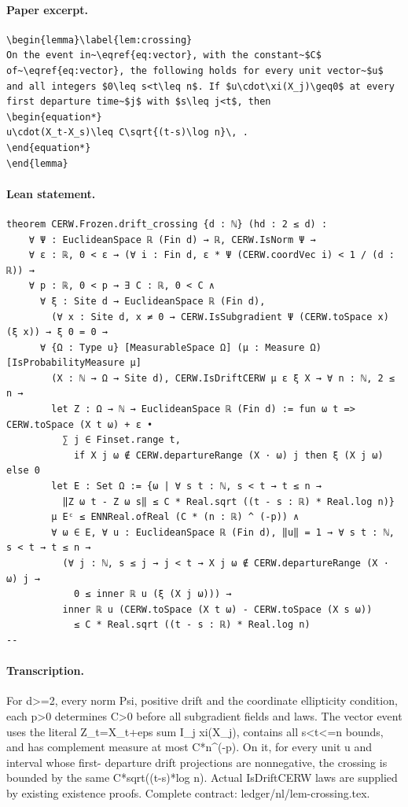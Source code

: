 \paragraph{Paper excerpt.}
\begin{verbatim}
\begin{lemma}\label{lem:crossing}
On the event in~\eqref{eq:vector}, with the constant~$C$ of~\eqref{eq:vector}, the following holds for every unit vector~$u$ and all integers $0\leq s<t\leq n$. If $u\cdot\xi(X_j)\geq0$ at every first departure time~$j$ with $s\leq j<t$, then
\begin{equation*}
u\cdot(X_t-X_s)\leq C\sqrt{(t-s)\log n}\, .
\end{equation*}
\end{lemma}
\end{verbatim}
\paragraph{Lean statement.}
\begin{verbatim}
theorem CERW.Frozen.drift_crossing {d : ℕ} (hd : 2 ≤ d) :
    ∀ Ψ : EuclideanSpace ℝ (Fin d) → ℝ, CERW.IsNorm Ψ →
    ∀ ε : ℝ, 0 < ε → (∀ i : Fin d, ε * Ψ (CERW.coordVec i) < 1 / (d : ℝ)) →
    ∀ p : ℝ, 0 < p → ∃ C : ℝ, 0 < C ∧
      ∀ ξ : Site d → EuclideanSpace ℝ (Fin d),
        (∀ x : Site d, x ≠ 0 → CERW.IsSubgradient Ψ (CERW.toSpace x) (ξ x)) → ξ 0 = 0 →
      ∀ {Ω : Type u} [MeasurableSpace Ω] (μ : Measure Ω) [IsProbabilityMeasure μ]
        (X : ℕ → Ω → Site d), CERW.IsDriftCERW μ ε ξ X → ∀ n : ℕ, 2 ≤ n →
        let Z : Ω → ℕ → EuclideanSpace ℝ (Fin d) := fun ω t => CERW.toSpace (X t ω) + ε •
          ∑ j ∈ Finset.range t,
            if X j ω ∉ CERW.departureRange (X · ω) j then ξ (X j ω) else 0
        let E : Set Ω := {ω | ∀ s t : ℕ, s < t → t ≤ n →
          ‖Z ω t - Z ω s‖ ≤ C * Real.sqrt ((t - s : ℝ) * Real.log n)}
        μ Eᶜ ≤ ENNReal.ofReal (C * (n : ℝ) ^ (-p)) ∧
        ∀ ω ∈ E, ∀ u : EuclideanSpace ℝ (Fin d), ‖u‖ = 1 → ∀ s t : ℕ, s < t → t ≤ n →
          (∀ j : ℕ, s ≤ j → j < t → X j ω ∉ CERW.departureRange (X · ω) j →
            0 ≤ inner ℝ u (ξ (X j ω))) →
          inner ℝ u (CERW.toSpace (X t ω) - CERW.toSpace (X s ω))
            ≤ C * Real.sqrt ((t - s : ℝ) * Real.log n)
--
\end{verbatim}
\paragraph{Transcription.}
For d>=2, every norm Psi, positive drift and the coordinate ellipticity condition, each p>0 determines C>0 before all subgradient fields and laws. The vector event uses the literal Z_t=X_t+eps sum I_j xi(X_j), contains all s<t<=n bounds, and has complement measure at most C*n^(-p). On it, for every unit u and interval whose first- departure drift projections are nonnegative, the crossing is bounded by the same C*sqrt((t-s)*log n). Actual IsDriftCERW laws are supplied by existing existence proofs. Complete contract: ledger/nl/lem-crossing.tex.

